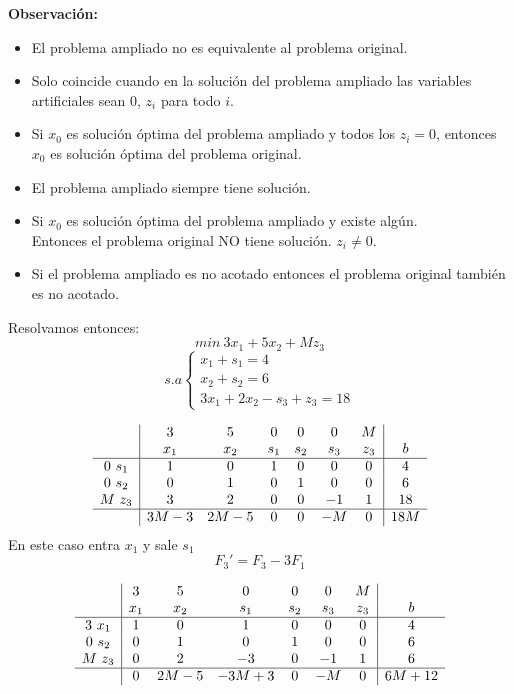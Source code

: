 \documentclass[11pt,fleqn]{book} %
\begin{document}
\textbf{Observación: }
\begin{itemize}
	\item El problema ampliado no es equivalente al problema original. 
	\item Solo coincide cuando en la solución del problema ampliado las variables artificiales sean $0$, $z_i$ para todo $i$.
	\item Si $x_0$ es solución óptima del problema ampliado y todos los $z_i=0$, entonces $x_0$ es solución óptima del problema original. 
	\item El problema ampliado siempre tiene solución.
	\item Si $x_0$ es solución óptima del problema ampliado y existe algún. \\
	Entonces el problema original NO tiene solución. $z_i\neq0$.
	\item Si el problema ampliado es no acotado entonces el problema original también es no acotado.
\end{itemize} 
Resolvamos entonces:
$$ min ~ 3x_1+5x_2+M z_3 $$
$$ s.a \left\{
\begin{array}{c}
x_1+s_1=4 \\
x_2 + s_2 = 6 \\
3x_1+2x_2-s_3+z_3=18
\end{array}
\right.
$$

$$ \begin{array}{c|cccccc|c}
& 3 & 5 & 0 & 0 & 0 & M & \\
& x_1 & x_2 & s_1 & s_2 & s_3 & z_3 & b \\ \hline
0 ~ s_1 & 1 & 0 & 1 & 0 & 0 & 0 & 4 \\
0 ~ s_2 & 0 & 1 & 0 & 1 & 0 & 0 & 6 \\
M ~ z_3 & 3 & 2 & 0 & 0 & -1 & 1 & 18 \\ \hline
& 3M-3 & 2M-5 & 0 & 0 & -M & 0 & 18M
\end{array}
$$
En este caso entra $x_1$ y sale $s_1$
$$F_3'=F_3-3F_1$$

$$ \begin{array}{c|cccccc|c}
& 3 & 5 & 0 & 0 & 0 & M & \\
& x_1 & x_2 & s_1 & s_2 & s_3 & z_3 & b \\ \hline
3 ~ x_1 & 1 & 0 & 1 & 0 & 0 & 0 & 4 \\
0 ~ s_2 & 0 & 1 & 0 & 1 & 0 & 0 & 6 \\
M ~ z_3 & 0 & 2 & -3 & 0 & -1 & 1 & 6 \\ \hline
& 0 & 2M-5 & -3M+3 & 0 & -M & 0 & 6M+12
\end{array}
$$
\end{document}
